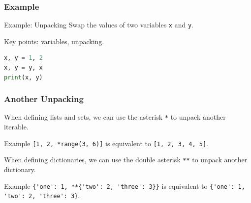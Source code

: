 \documentclass[beamer, en, version=2.0]{huangfusl-template}
\begin{document}
    \begin{frame}[fragile]
        \frametitle{Example}

        \begin{block}{Example: Unpacking}
            Swap the values of two variables {\footnotesize\verb|x|} and {\footnotesize\verb|y|}.
        \end{block}

        Key points: variables, unpacking.

        \pause

\begin{lstlisting}[language=python]
x, y = 1, 2
x, y = y, x
print(x, y)
\end{lstlisting}

    \end{frame}
    \begin{frame}[fragile]
        \frametitle{Another Unpacking}

        When defining lists and sets, we can use the asterisk {\footnotesize\verb|*|} to unpack another iterable.

        \begin{block}{Example}
            {\footnotesize\verb|[1, 2, *range(3, 6)]|} is equivalent to {\footnotesize\verb|[1, 2, 3, 4, 5]|}.
        \end{block}

        When defining dictionaries, we can use the double asterisk {\footnotesize\verb|**|} to unpack another dictionary.

        \begin{block}{Example}
            {\footnotesize\verb|{'one': 1, **{'two': 2, 'three': 3}}|} is equivalent to {\footnotesize\verb|{'one': 1, 'two': 2, 'three': 3}|}.
        \end{block}
    \end{frame}
\end{document}
